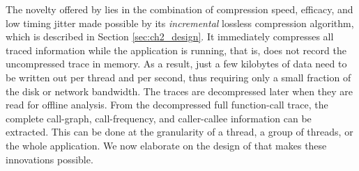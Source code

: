 The novelty offered by \parlot lies in the combination of compression
speed, efficacy, and low timing jitter
made possible by its {\em incremental}
lossless compression algorithm, which is
described in Section \ref{sec:ch2_design}.
%
It immediately compresses all traced information while the application is running, that is, \parlot does not record the uncompressed trace in memory.
%
As a result, just a few kilobytes of data need to be written out per thread and per second, thus requiring only a small fraction of the  disk or network bandwidth.
%
The traces are decompressed later when they are read for offline analysis.
%
From the decompressed full function-call trace, the complete call-graph,
call-frequency, and caller-callee information can be extracted.
%
This can be done at the granularity of a thread, a group of threads, or the whole application.
%
We now elaborate on the design of \parlot that makes
these innovations possible.
